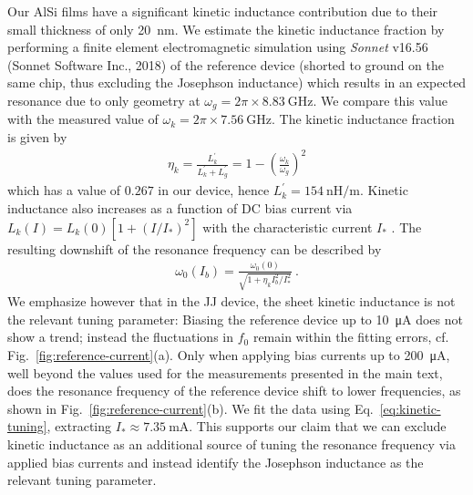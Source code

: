 % 
Our AlSi films have a significant kinetic inductance contribution due to their small thickness of only \SI{20}{nm}.
% 
We estimate the kinetic inductance fraction by performing a finite element electromagnetic simulation using \textit{Sonnet} v16.56 (Sonnet Software Inc., 2018) of the reference device (shorted to ground on the same chip, thus excluding the Josephson inductance) which results in an expected resonance due to only geometry at $\omega_{g}=2\pi\times\SI{8.83}{\giga\hertz}$.
% 
We compare this value with the measured value of $\omega_{k}=2\pi\times\SI{7.56}{\giga\hertz}$.
% 
The kinetic inductance fraction is given by~\cite{gaoExperimentalStudyKinetic2006}
% 
\begin{align}
\eta_k = \frac{L_k^\prime}{L_k^\prime+L_g^\prime}=1-\left(\frac{\omega_k}{\omega_g}\right)^2
\end{align}
% 
which has a value of $0.267$ in our device, hence $L_k^\prime=\SI{154}{\nano\henry\per\meter}$.
% 
Kinetic inductance also increases as a function of DC bias current via $L_k(I)=L_k(0)\left[1+(I/I_*)^2\right]$ with the characteristic current $I_*$ \cite{annunziataTunableSuperconductingNanoinductors2010}.
% 
The resulting downshift of the resonance frequency can be described by
% 
\begin{align}
\omega_0(I_b) = \frac{\omega_0(0)}{\sqrt{1+\eta_kI_b^2/I_*^{2}}} \ .
\label{eq:kinetic-tuning}
\end{align}
% 
We emphasize however that in the JJ device, the sheet kinetic inductance is not the relevant tuning parameter:
% 
Biasing the reference device up to \SI{10}{\micro\ampere} does not show a trend; instead the fluctuations in $f_0$ remain within the fitting errors, cf.  Fig.~\ref{fig:reference-current}(a).
% 
Only when applying bias currents up to \SI{200}{\micro\ampere}, well beyond the values used for the measurements presented in the main text, does the resonance frequency of the reference device shift to lower frequencies, as shown in Fig.~\ref{fig:reference-current}(b).
% 
We fit the data using Eq.~\eqref{eq:kinetic-tuning}, extracting $I_*\approx\SI{7.35}{\milli\ampere}$.
% 
This supports our claim that we can exclude kinetic inductance as an additional source of tuning the resonance frequency via applied bias currents and instead identify the Josephson inductance as the relevant tuning parameter.


